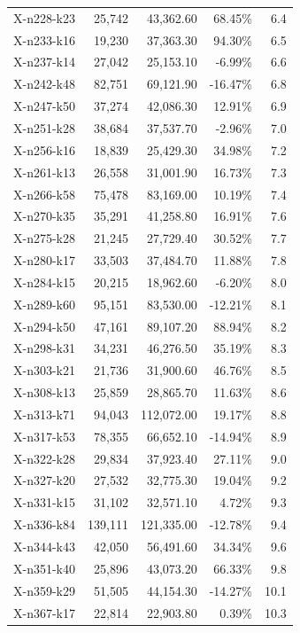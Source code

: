 \documentclass[12pt,a4paper]{article}
\begin{document}
\begin{longtable}{@{}lrrrr@{}}
    X-n228-k23 & 25,742 & 43,362.60 & 68.45\% & 6.4 \\
    X-n233-k16 & 19,230 & 37,363.30 & 94.30\% & 6.5 \\
    X-n237-k14 & 27,042 & 25,153.10 & -6.99\% & 6.6 \\
    X-n242-k48 & 82,751 & 69,121.90 & -16.47\% & 6.8 \\
    X-n247-k50 & 37,274 & 42,086.30 & 12.91\% & 6.9 \\
    X-n251-k28 & 38,684 & 37,537.70 & -2.96\% & 7.0 \\
    X-n256-k16 & 18,839 & 25,429.30 & 34.98\% & 7.2 \\
    X-n261-k13 & 26,558 & 31,001.90 & 16.73\% & 7.3 \\
    X-n266-k58 & 75,478 & 83,169.00 & 10.19\% & 7.4 \\
    X-n270-k35 & 35,291 & 41,258.80 & 16.91\% & 7.6 \\
    X-n275-k28 & 21,245 & 27,729.40 & 30.52\% & 7.7 \\
    X-n280-k17 & 33,503 & 37,484.70 & 11.88\% & 7.8 \\
    X-n284-k15 & 20,215 & 18,962.60 & -6.20\% & 8.0 \\
    X-n289-k60 & 95,151 & 83,530.00 & -12.21\% & 8.1 \\
    X-n294-k50 & 47,161 & 89,107.20 & 88.94\% & 8.2 \\
    X-n298-k31 & 34,231 & 46,276.50 & 35.19\% & 8.3 \\
    X-n303-k21 & 21,736 & 31,900.60 & 46.76\% & 8.5 \\
    X-n308-k13 & 25,859 & 28,865.70 & 11.63\% & 8.6 \\
    X-n313-k71 & 94,043 & 112,072.00 & 19.17\% & 8.8 \\
    X-n317-k53 & 78,355 & 66,652.10 & -14.94\% & 8.9 \\
    X-n322-k28 & 29,834 & 37,923.40 & 27.11\% & 9.0 \\
    X-n327-k20 & 27,532 & 32,775.30 & 19.04\% & 9.2 \\
    X-n331-k15 & 31,102 & 32,571.10 & 4.72\% & 9.3 \\
    X-n336-k84 & 139,111 & 121,335.00 & -12.78\% & 9.4 \\
    X-n344-k43 & 42,050 & 56,491.60 & 34.34\% & 9.6 \\
    X-n351-k40 & 25,896 & 43,073.20 & 66.33\% & 9.8 \\
    X-n359-k29 & 51,505 & 44,154.30 & -14.27\% & 10.1 \\
    X-n367-k17 & 22,814 & 22,903.80 & 0.39\% & 10.3 \\

\end{longtable}
\end{document}

